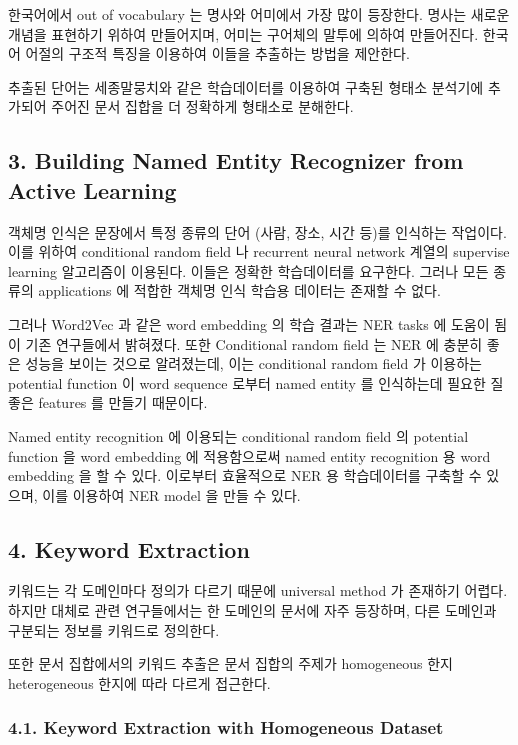 \documentclass[11pt]{article}
\begin{document}
한국어에서 out of vocabulary 는 명사와 어미에서 가장 많이 등장한다. 명사는 새로운 개념을 표현하기 위하여 만들어지며, 어미는 구어체의 말투에 의하여 만들어진다. 한국어 어절의 구조적 특징을 이용하여 이들을 추출하는 방법을 제안한다.

추출된 단어는 세종말뭉치와 같은 학습데이터를 이용하여 구축된 형태소 분석기에 추가되어 주어진 문서 집합을 더 정확하게 형태소로 분해한다.

\subsection*{3. Building Named Entity Recognizer from Active Learning}

객체명 인식은 문장에서 특정 종류의 단어 (사람, 장소, 시간 등)를 인식하는 작업이다. 이를 위하여 conditional random field 나 recurrent neural network 계열의 supervise learning 알고리즘이 이용된다. 이들은 정확한 학습데이터를 요구한다. 그러나 모든 종류의 applications 에 적합한 객체명 인식 학습용 데이터는 존재할 수 없다.

그러나 Word2Vec 과 같은 word embedding 의 학습 결과는 NER tasks 에 도움이 됨이 기존 연구들에서 밝혀졌다. 또한 Conditional random field 는 NER 에 충분히 좋은 성능을 보이는 것으로 알려졌는데, 이는 conditional random field 가 이용하는 potential function 이 word sequence 로부터 named entity 를 인식하는데 필요한 질 좋은 features 를 만들기 때문이다.

Named entity recognition 에 이용되는 conditional random field 의 potential function 을 word embedding 에 적용함으로써 named entity recognition 용 word embedding 을 할 수 있다. 이로부터 효율적으로 NER 용 학습데이터를 구축할 수 있으며, 이를 이용하여 NER model 을 만들 수 있다.

\subsection*{4. Keyword Extraction}

키워드는 각 도메인마다 정의가 다르기 때문에 universal method 가 존재하기 어렵다. 하지만 대체로 관련 연구들에서는 한 도메인의 문서에 자주 등장하며, 다른 도메인과 구분되는 정보를 키워드로 정의한다.

또한 문서 집합에서의 키워드 추출은 문서 집합의 주제가 homogeneous 한지 heterogeneous 한지에 따라 다르게 접근한다.

\subsubsection*{4.1. Keyword Extraction with Homogeneous Dataset}
\end{document}

